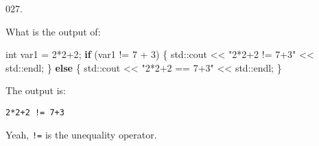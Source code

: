 \documentclass[]{book}
\newenvironment{Shaded}{}{}
\newcommand{\BuiltInTok}[1]{#1}
\newcommand{\ControlFlowTok}[1]{\textcolor[rgb]{0.00,0.44,0.13}{\textbf{#1}}}
\newcommand{\DataTypeTok}[1]{\textcolor[rgb]{0.56,0.13,0.00}{#1}}
\newcommand{\DecValTok}[1]{\textcolor[rgb]{0.25,0.63,0.44}{#1}}
\newcommand{\NormalTok}[1]{#1}
\newcommand{\StringTok}[1]{\textcolor[rgb]{0.25,0.44,0.63}{#1}}
\begin{document}
\begin{minipage}{\linewidth}\noindent
{\tiny 027.}\\
\begin{minipage}[t]{.485\linewidth}

What is the output of:

\begin{framed}

\begin{Shaded}
\begin{Highlighting}[]
\DataTypeTok{int}\NormalTok{ var1 = }\DecValTok{2}\NormalTok{*}\DecValTok{2+2}\NormalTok{;}
\ControlFlowTok{if}\NormalTok{ (var1 != }\DecValTok{7}\NormalTok{ + }\DecValTok{3}\NormalTok{) \{}
  \BuiltInTok{std::}\NormalTok{cout << }\StringTok{"2*2+2 != 7+3"}\NormalTok{ << }\BuiltInTok{std::}\NormalTok{endl;}
\NormalTok{\} }\ControlFlowTok{else}\NormalTok{ \{}
  \BuiltInTok{std::}\NormalTok{cout << }\StringTok{"2*2+2 == 7+3"}\NormalTok{ << }\BuiltInTok{std::}\NormalTok{endl;}
\NormalTok{\}}
\end{Highlighting}
\end{Shaded}

\end{framed}

\end{minipage}
\hfill
\begin{minipage}[t]{.485\linewidth}

The output is:

\begin{framed}

\begin{verbatim}
2*2+2 != 7+3
\end{verbatim}

\end{framed}

Yeah, \texttt{!=} is the unequality operator.

\end{minipage}
\end{minipage}

\vspace{2mm}\noindent\hrulefill{}
\end{document}
